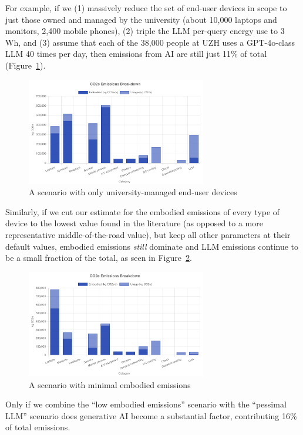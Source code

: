 \documentclass[11pt]{article}
\begin{document}
For example, if we (1) massively reduce the set of end-user devices in scope to just those owned and managed by the university (about 10,000 laptops and monitors, 2,400 mobile phones), (2) triple the LLM per-query energy use to 3 Wh, and (3) assume that each of the 38,000 people at UZH uses a GPT-4o-class LLM 40 times per day, then emissions from AI are still just 11\% of total (Figure~\ref{fig:sens1}).

\begin{figure}[h]
  \centering
  \includegraphics[width=0.7\textwidth]{fig-sens1.png}
  \caption{A scenario with only university-managed end-user devices}
  \label{fig:sens1}
\end{figure}

Similarly, if we cut our estimate for the embodied emissions of every type of device to the lowest value found in the literature (as opposed to a more representative middle-of-the-road value), but keep all other parameters at their default values,  embodied emissions {\em still} dominate and LLM emissions continue to be a small fraction of the total, as seen in Figure~\ref{fig:sens2}.

\begin{figure}[h]
  \centering
  \includegraphics[width=0.7\textwidth]{fig-sens2.png}
  \caption{A scenario with minimal embodied emissions}
  \label{fig:sens2}
\end{figure}

Only if we combine the ``low embodied emissions'' scenario with the ``pessimal LLM'' scenario does generative AI become a substantial factor, contributing 16\% of total emissions.
\end{document}
